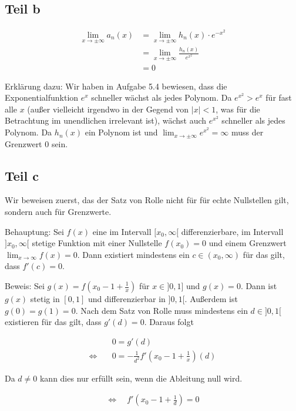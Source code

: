 \documentclass[a4paper,german,12pt,smallheadings]{scrartcl}
\begin{document}
\subsection*{Teil b}

\begin{align*}
  \lim_{x \to \pm \infty} a_n(x) &= \lim_{x \to \pm \infty} h_n(x) \cdot e^{-x^2} \\
  &= \lim_{x \to \pm \infty} \frac{h_n(x)}{e^{x^2}} \\
  &= 0
\end{align*}

Erklärung dazu: Wir haben in Aufgabe 5.4 bewiesen, dass die Exponentialfunktion
$e^x$ schneller wächst als jedes Polynom. Da $e^{x^2} > e^x$ für fast alle $x$
(außer vielleicht irgendwo in der Gegend von $|x| < 1$, was für die Betrachtung
im unendlichen irrelevant ist), wächst auch $e^{x^2}$ schneller als jedes
Polynom. Da $h_n(x)$ ein Polynom ist und $\lim_{x \to \pm \infty} e^{x^2} =
\infty$ muss der Grenzwert 0 sein.

\subsection*{Teil c}

Wir beweisen zuerst, das der Satz von Rolle nicht für für echte Nullstellen
gilt, sondern auch für Grenzwerte.

Behauptung: Sei $f(x)$ eine im Intervall $[x_0, \infty[$ differenzierbare, im
Intervall $]x_0, \infty[$ stetige Funktion mit einer Nullstelle $f(x_0) = 0$
und einem Grenzwert $\lim_{x \to \infty} f(x) = 0$. Dann existiert mindestens
ein $c \in (x_0, \infty)$ für das gilt, dass $f'(c) = 0$.

Beweis: Sei $g(x) = f\left(x_0 - 1 + \frac{1}{x}\right)$ für $x \in ]0, 1]$ und $g(x) =
0$. Dann ist $g(x)$ stetig in $[0,1]$ und differenzierbar in $]0, 1[$. Außerdem
ist $g(0) = g(1) = 0$. Nach dem Satz von Rolle muss mindestens ein $d \in ]0,1[$
existieren für das gilt, dass $g'(d) = 0$. Daraus folgt 

\begin{align*}
  &0 = g'(d) \\
  \Leftrightarrow\quad&0 = -\frac{1}{d^2} f'\left(x_0 - 1 + \frac{1}{x}\right)(d)
\end{align*}

Da $d \neq 0$ kann dies nur erfüllt sein, wenn die Ableitung null wird.

\begin{align*}
  \Leftrightarrow\quad f'\left(x_0 - 1 + \frac{1}{d}\right) = 0
\end{align*}
\end{document}
